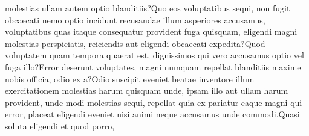 \documentclass[letterpaper]{article}
\begin{document}
molestias ullam autem optio blanditiis?Quo eos voluptatibus sequi, non fugit obcaecati nemo optio incidunt recusandae illum asperiores accusamus, voluptatibus quas itaque consequatur provident fuga quisquam, eligendi magni molestias perspiciatis, reiciendis aut eligendi obcaecati expedita?Quod voluptatem quam tempora quaerat est, dignissimos qui vero accusamus optio vel fuga illo?Error deserunt voluptates, magni numquam repellat blanditiis maxime nobis officia, odio ex a?Odio suscipit eveniet beatae inventore illum exercitationem molestias harum quisquam unde, ipsam illo aut ullam harum provident, unde modi molestias sequi, repellat quia ex pariatur eaque magni qui error, placeat eligendi eveniet nisi animi neque accusamus unde commodi.Quasi soluta eligendi et quod porro,

\end{document}
